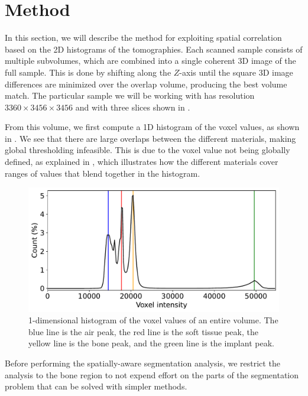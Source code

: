 \section{Method}
\label{sec:method}

In this section, we will describe the method for exploiting spatial correlation
based on the 2D histograms of the tomographies. Each scanned sample consists of
multiple subvolumes, which are combined into a single coherent 3D image of the
full sample. This is done by shifting along the $Z$-axis until the square 3D
image differences are minimized over the overlap volume, producing the best
volume match. The particular sample we will be working with has resolution
$3360 \times 3456 \times 3456$ and with three slices shown in
.

From this volume, we first compute a 1D histogram of the voxel values, as shown
in . We see that there are large overlaps between the
different materials, making global thresholding infeasible. This is due to the
voxel value not being globally defined, as explained in ,
which illustrates how the different materials cover ranges of values that blend
together in the histogram.

\begin{figure}
    \centering
    \includegraphics[width=\linewidth]{generated/770c_pag_hist_1d.pdf}
    \caption{
        1-dimensional histogram of the voxel values of an entire volume. The
        blue line is the air peak, the red line is the soft tissue peak, the
        yellow line is the bone peak, and the green line is the implant peak.
    }
    \label{fig:1d-hist}
\end{figure}

Before performing the spatially-aware segmentation analysis, we restrict the
analysis to the bone region to not expend effort on the parts of the
segmentation problem that can be solved with simpler methods.

